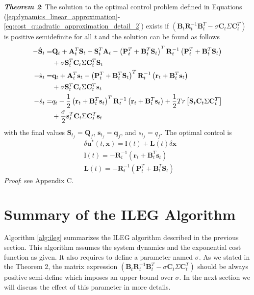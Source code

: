 \documentclass[letterpaper, 10 pt, conference]{ieeeconf}
\newcommand{\vl}{\mathbf l}
\newcommand{\vq}{\mathbf q}
\newcommand{\vr}{\mathbf r}
\newcommand{\vs}{\mathbf s}
\newcommand{\vu}{\mathbf u}
\newcommand{\vx}{\mathbf x}
\newcommand{\vA}{\mathbf A}
\newcommand{\vB}{\mathbf B}
\newcommand{\vC}{\mathbf C}
\newcommand{\vL}{\mathbf L}
\newcommand{\vP}{\mathbf P}
\newcommand{\vQ}{\mathbf Q}
\newcommand{\vR}{\mathbf R}
\newcommand{\vS}{\mathbf S}
\begin{document}
\textbf{\textit{Theorem 2}}: The solution to the optimal control problem defined in Equations\! (\ref{eq:dynamics_linear_approximation}-\ref{eq:cost_quadratic_approximation_detail_2}) exists if $\left( \vB_t\vR_t^{-1}\vB_t^T -\sigma \vC_t\Sigma\vC_t^T \right)$ is positive semidefinite for all \textit{t} and the solution can be found as follows
\begin{align}
-\dot{\vS}_t =& \vQ_{t} + \vA_t^T \vS_t + \vS_t^T \vA_t - \left( \vP_t^T + \vB_t^T \vS_t \right)^T \vR_t^{-1} \left( \vP_t^T + \vB_t^T \vS_t \right) \notag \\
 &+ \sigma \vS_t^T \vC_t\Sigma\vC_t^T \vS_t  \label{eq:riccati_Sm}\\
-\dot{\vs}_t =& \vq_{t} + \vA_t^T \vs_t - \left( \vP_t^T + \vB_t^T \vS_t \right)^T \vR_t^{-1} \left( \vr_t + \vB_t^T \vs_t \right) \notag \\ 
&+ \sigma  \vS_t^T \vC_t\Sigma\vC_t^T \vs_t \label{eq:riccati_Sv}\\
-\dot{s}_t =& q_{t} - \frac{1}{2} \left( \vr_t + \vB_t^T \vs_t \right)^T \vR_t^{-1} \left( \vr_t + \vB_t^T \vs_t \right) + \frac{1}{2} Tr\left[ \vS_t \vC_t\Sigma\vC_t^T \right] \notag \\
&+ \frac{\sigma}{2} \vs_t^T \vC_t\Sigma\vC_t^T \vs_t   \label{eq:riccati_s}
\end{align}
with the final values $\vS_{t_f} = \vQ_{f}$, $\vs_{t_f} = \vq_{f}$, and $s_{t_f} = q_{f}$. The optimal control is
\begin{align}
&\delta\vu^*(t,\vx) = \vl(t) + \vL(t) \delta\vx \label{eq:optimal_control_update}\\
&\vl(t) = - \vR_t^{-1} \left( \vr_t + \vB_t^T \vs_t \right) \label{eq:optimal_control_l}\\
&\vL(t) = - \vR_t^{-1} \left( \vP_t^T + \vB_t^T \vS_t \right) \label{eq:optimal_control_L}
\end{align}
\textit{Proof}: see Appendix C.


\section{Summary of the ILEG Algorithm}
Algorithm \ref{alg:ileg} summarizes the ILEG algorithm described in the previous
section. This algorithm assumes the system dynamics and the exponential cost
function as given. It also requires to define a parameter named $\sigma$. As we
stated in the Theorem 2, the matrix expression $\left( \vB_t\vR_t^{-1}\vB_t^T
-\sigma \vC_t\Sigma\vC_t^T \right)$ should be always positive semi-define which
imposes an upper bound over $\sigma$. In the next section we will discuss the
effect of this parameter in more details.
\end{document}

